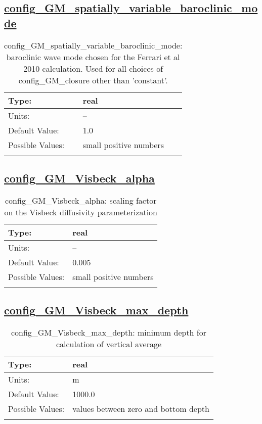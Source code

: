 \subsection[config\_GM\_spatially\_variable\_baroclinic\_mode]{\hyperref[sec:nm_tab_GM_eddy_parameterization]{config\_GM\_spatially\_variable\_baroclinic\_mode}}
\label{subsec:nm_sec_config_GM_spatially_variable_baroclinic_mode}
\begin{center}
\begin{longtable}{| p{2.0in} || p{4.0in} |}
    \hline
    Type: & real \\
    \hline
    Units: & -- \\
    \hline
    Default Value: & 1.0 \\
    \hline
    Possible Values: & small positive numbers \\
    \hline
    \caption{config\_GM\_spatially\_variable\_baroclinic\_mode: baroclinic wave mode chosen for the Ferrari et al 2010 calculation. Used for all choices of config\_GM\_closure other than 'constant'.}
\end{longtable}
\end{center}
\subsection[config\_GM\_Visbeck\_alpha]{\hyperref[sec:nm_tab_GM_eddy_parameterization]{config\_GM\_Visbeck\_alpha}}
\label{subsec:nm_sec_config_GM_Visbeck_alpha}
\begin{center}
\begin{longtable}{| p{2.0in} || p{4.0in} |}
    \hline
    Type: & real \\
    \hline
    Units: & -- \\
    \hline
    Default Value: & 0.005 \\
    \hline
    Possible Values: & small positive numbers \\
    \hline
    \caption{config\_GM\_Visbeck\_alpha: scaling factor on the Visbeck diffusivity parameterization}
\end{longtable}
\end{center}
\subsection[config\_GM\_Visbeck\_max\_depth]{\hyperref[sec:nm_tab_GM_eddy_parameterization]{config\_GM\_Visbeck\_max\_depth}}
\label{subsec:nm_sec_config_GM_Visbeck_max_depth}
\begin{center}
\begin{longtable}{| p{2.0in} || p{4.0in} |}
    \hline
    Type: & real \\
    \hline
    Units: & \si{m} \\
    \hline
    Default Value: & 1000.0 \\
    \hline
    Possible Values: & values between zero and bottom depth \\
    \hline
    \caption{config\_GM\_Visbeck\_max\_depth: minimum depth for calculation of vertical average}
\end{longtable}
\end{center}
